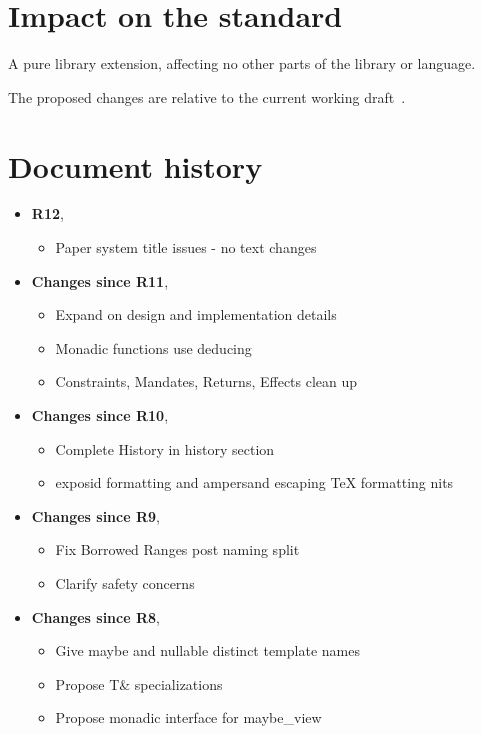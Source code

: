 \documentclass[a4paper,10pt,oneside,openany,final,article]{memoir}
\begin{document}
\chapter{Impact on the standard}

A pure library extension, affecting no other parts of the library or language.

The proposed changes are relative to the current working draft~\cite{N4958}.

\chapter*{Document history}

\begin{itemize}
\item \textbf{R12},
  \begin{itemize}
  \item Paper system title issues - no text changes
  \end{itemize}
\item \textbf{Changes since R11},
  \begin{itemize}
  \item Expand on design and implementation details
  \item Monadic functions use deducing 
  \item Constraints, Mandates, Returns, Effects clean up
  \end{itemize}
\item \textbf{Changes since R10},
  \begin{itemize}
  \item Complete History in history section
  \item exposid formatting and ampersand escaping TeX formatting nits
  \end{itemize}
\item \textbf{Changes since R9},
  \begin{itemize}
  \item Fix Borrowed Ranges post naming split
  \item Clarify safety concerns
  \end{itemize}
\item \textbf{Changes since R8},
  \begin{itemize}
  \item Give maybe and nullable distinct template names
  \item Propose T\& specializations
  \item Propose monadic interface for maybe_view

\end{itemize}
\end{itemize}
\end{document}
